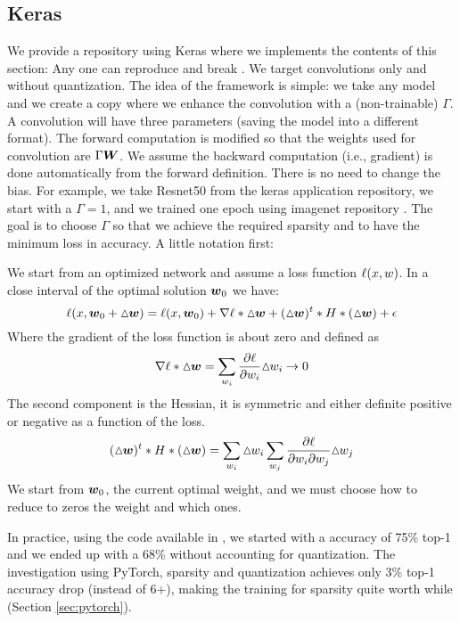 \documentclass[conference]{IEEEtran}
\begin{document}
\subsection{Keras}
We provide a repository using Keras \cite{chollet2015keras} where we
implements the contents of this section: Any one can reproduce and
break \cite{PaoloK2020}. We target convolutions only and without
quantization. The idea of the framework is simple: we take any model
and we create a copy where we enhance the convolution with a
(non-trainable) $\Gamma$. A convolution will have three parameters
(saving the model into a different format).  The forward computation
is modified so that the weights used for convolution are
$\Gamma{\boldsymbol W}$. We assume the backward computation (i.e., gradient) is
done automatically from the forward definition. There is no need to
change the bias. For example, we take Resnet50 from the keras
application repository, we start with a $\Gamma=1$, and we trained one
epoch using imagenet repository \cite{deng2009imagenet}.  The goal is
to choose $\Gamma$ so that we achieve the required sparsity and to
have the minimum loss in accuracy. A little notation first:

We start from an optimized network and assume a loss function ${\bf
  \ell}(x,w)$.  In a close interval of the optimal solution ${\boldsymbol w}_0$
we have:
\begin{equation}
  \label{eq:loss}
  {\bf \ell}(x,\Vc{w}_0 +\Triangle{\Vc{w})} = {\bf \ell}(x,\Vc{w}_0) +
  \nabla{\bf \ell}*\Triangle{\Vc{w}} + (\Triangle{\Vc{w}})^t *H*
  (\Triangle{\Vc{w}}) + \epsilon
\end{equation}
Where the gradient of the loss function is about zero and defined as
\begin{equation}
  \nabla{\bf \ell}* {\vartriangle\!\! {\boldsymbol w} } = \sum_{w_i}
  \frac{\partial\ell}{\partial w_i} {\vartriangle\!\! w_i } \rightarrow 0
\end{equation}
The second component is the Hessian, it is symmetric and either
definite positive or negative as a function of the loss.
\begin{equation}
  (\Triangle{\Vc{w}})^t *H*(\Triangle{\Vc{w}}) = \sum_{w_i}
  \Triangle{w_i} \sum_{w_j} \frac{\partial\ell}{\partial w_i\partial
    w_j} \Triangle{w_j}
\end{equation}
We start from ${\boldsymbol w}_0$, the current optimal weight, and we must
choose how to reduce to zeros the weight and which ones.

In practice, using the code available in \cite{PaoloK2020}, we started
with a accuracy of 75\% top-1 and we ended up with a 68\% without
accounting for quantization. The investigation using PyTorch, sparsity
and quantization achieves only 3\% top-1 accuracy drop (instead of
6+), making the training for sparsity quite worth while (Section \ref{sec:pytorch}).
\end{document}
